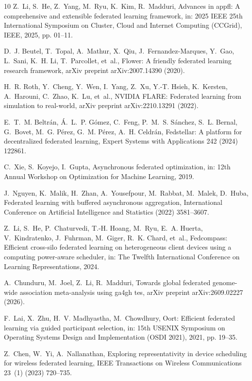 \documentclass[preprint,12pt, a4paper]{elsarticle}
\begin{document}
\begin{thebibliography}{10}
Z.~Li, S.~He, Z.~Yang, M.~Ryu, K.~Kim, R.~Madduri, Advances in appfl: A comprehensive and extensible federated learning framework, in: 2025 IEEE 25th International Symposium on Cluster, Cloud and Internet Computing (CCGrid), IEEE, 2025, pp. 01--11.

D.~J. Beutel, T.~Topal, A.~Mathur, X.~Qiu, J.~Fernandez-Marques, Y.~Gao, L.~Sani, K.~H. Li, T.~Parcollet, et~al., Flower: A friendly federated learning research framework, arXiv preprint arXiv:2007.14390 (2020).

H.~R. Roth, Y.~Cheng, Y.~Wen, I.~Yang, Z.~Xu, Y.-T. Hsieh, K.~Kersten, A.~Harouni, C.~Zhao, K.~Lu, et~al., {NVIDIA FLARE}: Federated learning from simulation to real-world, arXiv preprint arXiv:2210.13291 (2022).

E.~T.~M. Beltr{\'a}n, {\'A}.~L.~P. G{\'o}mez, C.~Feng, P.~M.~S. S{\'a}nchez, S.~L. Bernal, G.~Bovet, M.~G. P{\'e}rez, G.~M. P{\'e}rez, A.~H. Celdr{\'a}n, Fedstellar: A platform for decentralized federated learning, Expert Systems with Applications 242 (2024) 122861.

C.~Xie, S.~Koyejo, I.~Gupta, Asynchronous federated optimization, in: 12th Annual Workshop on Optimization for Machine Learning, 2019.

J.~Nguyen, K.~Malik, H.~Zhan, A.~Yousefpour, M.~Rabbat, M.~Malek, D.~Huba, Federated learning with buffered asynchronous aggregation, International Conference on Artificial Intelligence and Statistics (2022) 3581--3607.

Z.~Li, S.~He, P.~Chaturvedi, T.-H. Hoang, M.~Ryu, E.~A. Huerta, V.~Kindratenko, J.~Fuhrman, M.~Giger, R.~K. Chard, et~al., Fedcompass: Efficient cross-silo federated learning on heterogeneous client devices using a computing power-aware scheduler, in: The Twelfth International Conference on Learning Representations, 2024.

A.~Chunduru, M.~Joel, Z.~Li, R.~Madduri, Towards global federated genome-wide association meta-analysis using ga4gh tes, arXiv preprint arXiv:2609.02227 (2026).

F.~Lai, X.~Zhu, H.~V. Madhyastha, M.~Chowdhury, Oort: Efficient federated learning via guided participant selection, in: 15th USENIX Symposium on Operating Systems Design and Implementation (OSDI 2021), 2021, pp. 19--35.

Z.~Chen, W.~Yi, A.~Nallanathan, Exploring representativity in device scheduling for wireless federated learning, IEEE Transactions on Wireless Communications 23~(1) (2023) 720--735.

\end{thebibliography}
\end{document}
